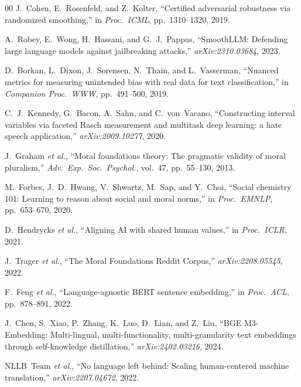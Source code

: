 \documentclass[journal]{IEEEtran}
\begin{document}
\begin{thebibliography}{00}
J.~Cohen, E.~Rosenfeld, and Z.~Kolter, ``Certified adversarial robustness via
randomized smoothing,'' in \emph{Proc.\ ICML}, pp.~1310--1320, 2019.

A.~Robey, E.~Wong, H.~Hassani, and G.~J.~Pappas, ``SmoothLLM: Defending large
language models against jailbreaking attacks,'' \emph{arXiv:2310.03684},
2023.

D.~Borkan, L.~Dixon, J.~Sorensen, N.~Thain, and L.~Vasserman, ``Nuanced
metrics for measuring unintended bias with real data for text
classification,'' in \emph{Companion Proc.\ WWW}, pp.~491--500, 2019.

C.~J.~Kennedy, G.~Bacon, A.~Sahn, and C.~von~Vacano, ``Constructing interval
variables via faceted Rasch measurement and multitask deep learning: a
hate speech application,'' \emph{arXiv:2009.10277}, 2020.

J.~Graham \emph{et al.}, ``Moral foundations theory: The pragmatic validity
of moral pluralism,'' \emph{Adv.\ Exp.\ Soc.\ Psychol.}, vol.~47,
pp.~55--130, 2013.

M.~Forbes, J.~D.~Hwang, V.~Shwartz, M.~Sap, and Y.~Choi, ``Social chemistry
101: Learning to reason about social and moral norms,'' in \emph{Proc.\
EMNLP}, pp.~653--670, 2020.

D.~Hendrycks \emph{et al.}, ``Aligning AI with shared human values,'' in
\emph{Proc.\ ICLR}, 2021.

J.~Trager \emph{et al.}, ``The Moral Foundations Reddit Corpus,''
\emph{arXiv:2208.05545}, 2022.

F.~Feng \emph{et al.}, ``Language-agnostic BERT sentence embedding,'' in
\emph{Proc.\ ACL}, pp.~878--891, 2022.

J.~Chen, S.~Xiao, P.~Zhang, K.~Luo, D.~Lian, and Z.~Liu, ``BGE M3-Embedding:
Multi-lingual, multi-functionality, multi-granularity text embeddings through
self-knowledge distillation,'' \emph{arXiv:2402.03216}, 2024.

NLLB~Team \emph{et al.}, ``No language left behind: Scaling human-centered
machine translation,'' \emph{arXiv:2207.04672}, 2022.

\end{thebibliography}

\balance
\end{document}
